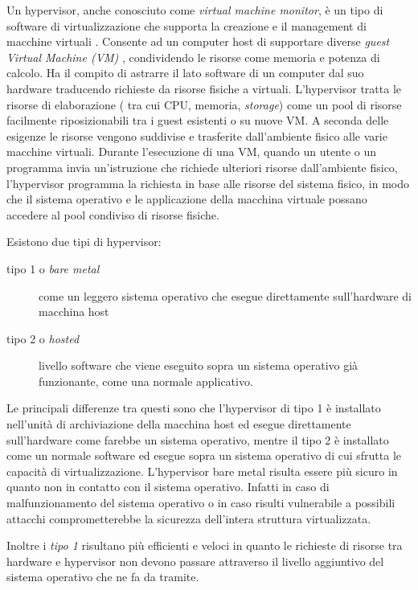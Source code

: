 Un hypervisor, anche conosciuto come \textit{virtual machine monitor}, è un tipo di software di virtualizzazione che supporta la creazione e il management di macchine virtuali \cite{desai2013hypervisor,techtargetHypervisor}. Consente ad un computer host di supportare diverse \textit{guest Virtual Machine (VM)}  , condividendo le risorse come memoria e potenza di calcolo.
Ha il compito di astrarre il lato software di un computer dal suo hardware traducendo richieste da risorse fisiche a virtuali.
L'hypervisor tratta le risorse di elaborazione ( tra cui CPU, memoria, \textit{storage}) come un pool di risorse facilmente riposizionabili tra i guest esistenti o su nuove VM.
A seconda delle esigenze le risorse vengono suddivise e trasferite dall'ambiente fisico alle varie macchine virtuali. Durante l'esecuzione di una VM, quando un utente o un programma invia un'istruzione che richiede ulteriori risorse dall'ambiente fisico, l'hypervisor programma la richiesta in base alle risorse del sistema fisico, in modo che il sistema operativo e le applicazione della macchina virtuale possano accedere al pool condiviso di risorse fisiche.

Esistono due tipi di hypervisor:
\begin{description}
    \item[tipo 1 o \textit{bare metal}] come un leggero sistema operativo che esegue direttamente sull'hardware di macchina host
    \item[tipo 2 o \textit{hosted}] livello software  che viene eseguito  sopra un sistema operativo già funzionante, come una normale applicativo.
\end{description}

Le principali differenze tra questi sono che l'hypervisor di tipo 1 è installato nell'unità di archiviazione della macchina host ed esegue direttamente sull'hardware come farebbe un sistema operativo, mentre il tipo 2 è installato come un normale software ed esegue sopra un sistema operativo di cui sfrutta le capacità di virtualizzazione.
L'hypervisor bare metal risulta essere più sicuro in quanto non in contatto con il sistema operativo. Infatti in caso di malfunzionamento del sistema operativo o in caso risulti vulnerabile a possibili attacchi comprometterebbe la sicurezza dell'intera struttura virtualizzata.

Inoltre i \textit{tipo 1} risultano più efficienti e veloci in quanto le richieste di risorse tra hardware e hypervisor non devono passare attraverso il livello aggiuntivo del sistema operativo che ne fa da tramite.

